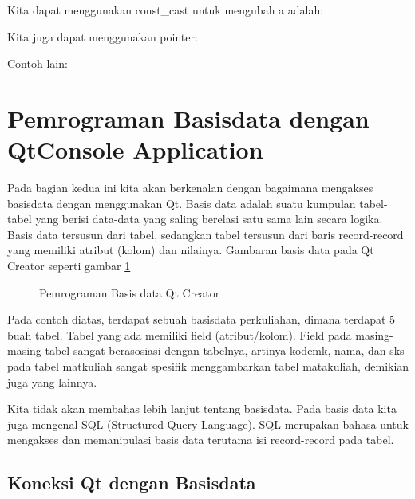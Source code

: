 

Kita dapat menggunakan const\_cast untuk mengubah a adalah:



Kita juga dapat menggunakan pointer:



Contoh lain:



\section{Pemrograman Basisdata dengan QtConsole Application}\label{pemrograman-basisdata-dengan-qtconsole-application}

Pada bagian kedua ini kita akan berkenalan dengan bagaimana mengakses
basisdata dengan menggunakan Qt. Basis data adalah suatu kumpulan
tabel-tabel yang berisi data-data yang saling berelasi satu sama lain
secara logika. Basis data tersusun dari tabel, sedangkan tabel tersusun
dari baris record-record yang memiliki atribut (kolom) dan nilainya.
Gambaran basis data pada Qt Creator seperti gambar \ref{fig:basis-data-qt}

\begin{figure}
\centering
{}
\caption{Pemrograman Basis data Qt Creator}
\label{fig:basis-data-qt}
\end{figure}


Pada contoh diatas, terdapat sebuah basisdata perkuliahan, dimana
terdapat 5 buah tabel. Tabel yang ada memiliki field (atribut/kolom).
Field pada masing-masing tabel sangat berasosiasi dengan tabelnya,
artinya kodemk, nama, dan sks pada tabel matkuliah sangat spesifik
menggambarkan tabel matakuliah, demikian juga yang lainnya.

Kita tidak akan membahas lebih lanjut tentang basisdata. Pada basis data
kita juga mengenal SQL (Structured Query Language). SQL merupakan bahasa
untuk mengakses dan memanipulasi basis data terutama isi record-record
pada tabel.

\subsection{Koneksi Qt dengan Basisdata}\label{koneksi-qt-dengan-basisdata}

